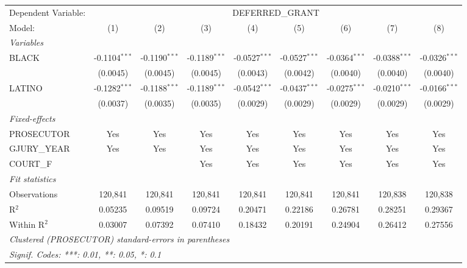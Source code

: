 
\begingroup
\centering
\begin{tabular}{lcccccccc}
   \tabularnewline \midrule \midrule
   Dependent Variable: & \multicolumn{8}{c}{DEFERRED\_GRANT}\\
   Model:       & (1)             & (2)             & (3)             & (4)             & (5)             & (6)             & (7)             & (8)\\  
   \midrule
   \emph{Variables}\\
   BLACK        & -0.1104$^{***}$ & -0.1190$^{***}$ & -0.1189$^{***}$ & -0.0527$^{***}$ & -0.0527$^{***}$ & -0.0364$^{***}$ & -0.0388$^{***}$ & -0.0326$^{***}$\\   
                & (0.0045)        & (0.0045)        & (0.0045)        & (0.0043)        & (0.0042)        & (0.0040)        & (0.0040)        & (0.0040)\\   
   LATINO       & -0.1282$^{***}$ & -0.1188$^{***}$ & -0.1189$^{***}$ & -0.0542$^{***}$ & -0.0437$^{***}$ & -0.0275$^{***}$ & -0.0210$^{***}$ & -0.0166$^{***}$\\   
                & (0.0037)        & (0.0035)        & (0.0035)        & (0.0029)        & (0.0029)        & (0.0029)        & (0.0029)        & (0.0029)\\   
   \midrule
   \emph{Fixed-effects}\\
   PROSECUTOR   & Yes             & Yes             & Yes             & Yes             & Yes             & Yes             & Yes             & Yes\\  
   GJURY\_YEAR  & Yes             & Yes             & Yes             & Yes             & Yes             & Yes             & Yes             & Yes\\  
   COURT\_F     &                 &                 & Yes             & Yes             & Yes             & Yes             & Yes             & Yes\\  
   \midrule
   \emph{Fit statistics}\\
   Observations & 120,841         & 120,841         & 120,841         & 120,841         & 120,841         & 120,841         & 120,838         & 120,838\\  
   R$^2$        & 0.05235         & 0.09519         & 0.09724         & 0.20471         & 0.22186         & 0.26781         & 0.28251         & 0.29367\\  
   Within R$^2$ & 0.03007         & 0.07392         & 0.07410         & 0.18432         & 0.20191         & 0.24904         & 0.26412         & 0.27556\\  
   \midrule \midrule
   \multicolumn{9}{l}{\emph{Clustered (PROSECUTOR) standard-errors in parentheses}}\\
   \multicolumn{9}{l}{\emph{Signif. Codes: ***: 0.01, **: 0.05, *: 0.1}}\\
\end{tabular}
\par\endgroup



